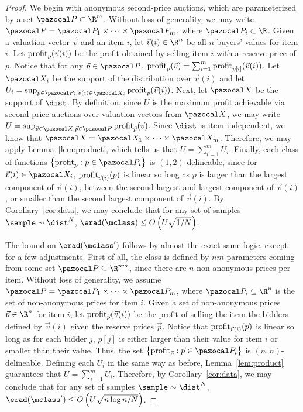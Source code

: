 \secondPriceProduct*

\begin{proof}
We begin with anonymous second-price auctions, which are parameterized by a set $\pspace \subset \R^m$. Without loss of generality, we may write $\pspace = \pspace_1 \times \cdots \times \pspace_m$, where $\pspace_i \subset \R$. Given a valuation vector $\vec{v}$ and an item $i$, let $\vec{v}(i) \in \R^n$ be all $n$ buyers' values for item $i$. Let $\textnormal{profit}_p(\vec{v}(i))$ be the profit obtained by selling item $i$ with a reserve price of $p$. Notice that for any $\vec{p} \in \pspace$, $\textnormal{profit}_{\vec{p}}(\vec{v}) = \sum_{i = 1}^m \textnormal{profit}_{p[i]}(\vec{v}(i))$. Let $\domain_i$ be the support of the distribution over $\vec{v}(i)$ and let $U_i = \sup_{p \in \pspace_i, \vec{v}(i) \in \domain_i} \profit_{p}(\vec{v}(i))$. Next, let
$\domain$ be the support of $\dist$. By definition, since $U$ is the maximum profit achievable via second price auctions over valuation vectors from $\domain$, we may write $U = \sup_{\vec{v} \in \domain, \vec{p} \in \pspace}\profit_{\vec{p}}(\vec{v})$.  Since $\dist$ is item-independent, we know that $\domain = \domain_1 \times \cdots \times \domain_m$. Therefore, we may apply Lemma~\ref{lem:product}, which tells us that $U = \sum_{i = 1}^m U_i$. Finally, each class of functions $\left\{\profit_{p} : p \in \pspace_i\right\}$ is $(1, 2)$-delineable, since for $\vec{v}(i) \in \domain_i$, $\textnormal{profit}_{\vec{v}(i)}(p)$ is linear so long as $p$ is larger than the largest component of $\vec{v}(i)$, between the second largest and largest component of $\vec{v}(i)$, or smaller than the second largest component of $\vec{v}(i)$. By Corollary~\ref{cor:data}, we may conclude that for any set of samples $\sample \sim \dist^N$, $\erad(\mclass) \leq O\left(U\sqrt{1/N}\right)$.

The bound on $\erad(\mclass')$ follows by almost the exact same logic, except for a few adjustments. First of all, the class is defined by $nm$ parameters coming from some set $\pspace \subseteq \R^{nm}$, since there are $n$ non-anonymous prices per item. Without loss of generality, we assume $\pspace = \pspace_1 \times \cdots \times \pspace_m$, where $\pspace_i \subseteq \R^n$ is the set of non-anonymous prices for item $i$. Given a set of non-anonymous prices $\vec{p} \in \R^n$ for item $i$, let $\textnormal{profit}_{\vec{p}}(\vec{v}(i))$ be the profit of selling the item the bidders defined by $\vec{v}(i)$ given the reserve prices $\vec{p}$. Notice that $\textnormal{profit}_{\vec{v}(i)}(\vec{p})$ is linear so long as for each bidder $j$, $p[j]$ is either larger than their value for item $i$ or smaller than their value. Thus, the set $\left\{\profit_{\vec{p}} : \vec{p} \in \pspace_i\right\}$ is $(n,n)$-delineable. Defining each $U_i$ in the same way as before, Lemma~\ref{lem:product} guarantees that $U = \sum_{i = 1}^m U_i$. Therefore, by Corollary~\ref{cor:data}, we may conclude that for any set of samples $\sample \sim \dist^N$, $\erad(\mclass') \leq O\left(U\sqrt{n \log n/N}\right)$.
\end{proof}

